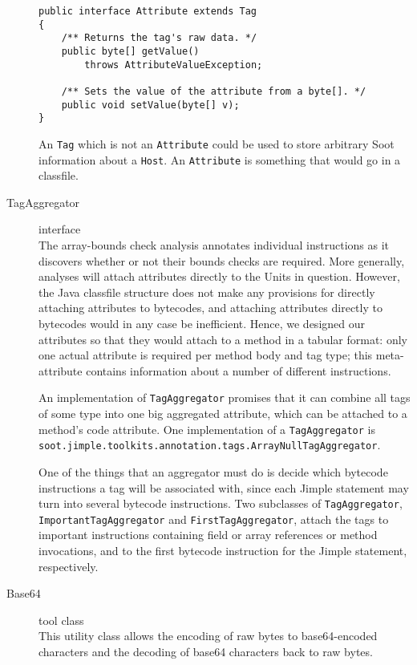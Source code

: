 \documentclass{article}
\begin{document}
\begin{description}
\begin{verbatim}
public interface Attribute extends Tag
{
    /** Returns the tag's raw data. */
    public byte[] getValue() 
        throws AttributeValueException;

    /** Sets the value of the attribute from a byte[]. */
    public void setValue(byte[] v);
}
\end{verbatim}

An {\tt Tag} which is not an {\tt Attribute} could be used
to store arbitrary Soot information about a {\tt Host}.  An {\tt Attribute}
is something that would go in a classfile.

\item[TagAggregator] interface\\ The array-bounds check analysis
annotates individual instructions as it discovers whether or not their
bounds checks are required.  More generally, analyses will attach
attributes directly to the Units in question.  However, the Java
classfile structure does not make any provisions for directly attaching
attributes to bytecodes, and attaching attributes directly to
bytecodes would in any case be inefficient.  Hence, we designed our
attributes so that they would attach to a method in a tabular
format: only one actual attribute is required per method body and tag
type; this meta-attribute contains information about a number of
different instructions.

An implementation of {\tt TagAggregator} promises that it can combine
all tags of some type into one big aggregated attribute, which can be
attached to a method's code attribute.  One implementation of a 
{\tt TagAggregator} is 
{\tt soot.jimple.toolkits.annotation.tags.ArrayNullTagAggregator}.

One of the things that an aggregator must do is decide which bytecode
instructions a tag will be associated with, since each Jimple statement
may turn into several bytecode instructions. Two subclasses of 
{\tt TagAggregator}, {\tt ImportantTagAggregator} and {\tt FirstTagAggregator},
attach the tags to important instructions containing field or array references
or method invocations, and to the first bytecode instruction for the Jimple
statement, respectively.

\item[Base64] tool class\\
This utility class allows the encoding of raw bytes to base64-encoded 
characters and the decoding of base64 characters back to raw bytes.
    

\end{description}
\end{document}
